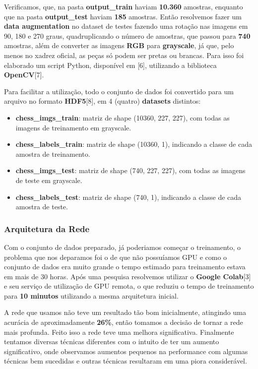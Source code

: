 Verificamos, que, na pasta \textbf{output\_train} haviam \textbf{10.360} amostras, enquanto que
na pasta \textbf{output\_test} haviam \textbf{185} amostras. Então resolvemos fazer
um \textbf{data augmentation} no dataset de testes fazendo uma rotação nas imagens
em 90, 180 e 270 graus, quadruplicando o número de amostras, que passou para \textbf{740}
amostras, além de converter as imagens \textbf{RGB} para \textbf{grayscale}, já que,
pelo menos no xadrez oficial, as peças só podem ser pretas ou brancas. Para isso
foi elaborado um script Python, disponível em [6], utilizando a biblioteca \textbf{OpenCV}[7].

Para facilitar a utilização, todo o conjunto de dados foi convertido para um arquivo
no formato \textbf{HDF5}[8], em 4 (quatro) \textbf{datasets} distintos:

\begin{itemize}
    \item \textbf{chess\_imgs\_train}: matriz de shape (10360, 227, 227), com todas
    as imagens de treinamento em grayscale.
    \item \textbf{chess\_labels\_train}: matriz de shape (10360, 1), indicando a
    classe de cada amostra de treinamento.
    \item \textbf{chess\_imgs\_test}: matriz de shape (740, 227, 227), com todas as
    imagens de teste em grayscale.
    \item \textbf{chess\_labels\_test}: matriz de shape (740, 1), indicando a classe
    de cada amostra de teste.
\end{itemize}

    \subsubsection{Arquitetura da Rede}

Com o conjunto de dados preparado, já poderiamos começar o treinamento, o problema
que nos deparamos foi o de que não possuíamos GPU e como o conjunto de dados era muito
grande o tempo estimado para treinamento estava em mais de 30 horas.
Após uma pesquisa resolvemos utilizar o \textbf{Google Colab}[3] e seu
serviço de utilização de GPU remota, o que reduziu o tempo de
treinamento para \textbf{10 minutos} utilizando a mesma arquitetura
inicial.

A rede que usamos não teve um resultado tão bom inicialmente, atingindo uma
acurácia de aproximadamente \textbf{26\%}, então tomamos a decisão de tornar a
rede mais profunda. Feito isso a rede teve uma melhora significativa.
Finalmente tentamos diversas técnicas diferentes com o intuito de ter um aumento
significativo, onde observamos aumentos pequenos na performance com algumas
técnicas bem sucedidas e outras técnicas resultaram em uma piora considerável.

